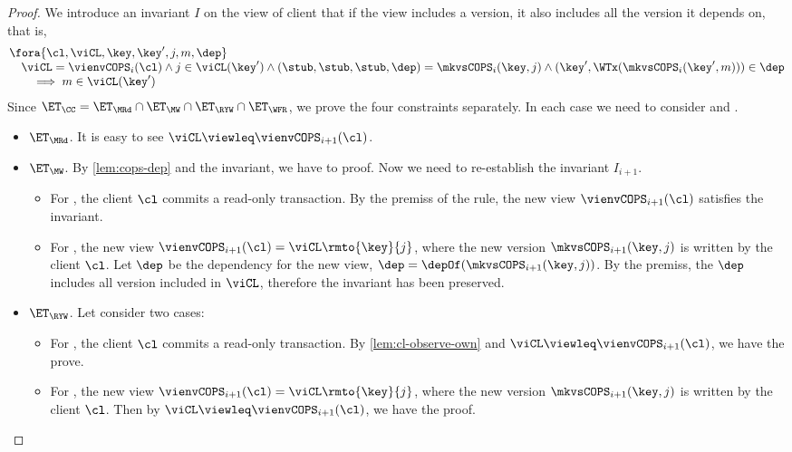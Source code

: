 \begin{proof}
    We introduce an invariant \( I \) on the view of client that if the view includes a version, 
    it also includes all the version it depends on, that is,
    \[
        \begin{array}{@{}l@{}}
        \fora{\cl, \viCL,\key,\key',j,m,\dep} \\
        \quad \viCL = \vienvCOPS_i(\cl) \land j \in \viCL(\key') 
        \land (\stub,\stub,\stub,\dep) = \mkvsCOPS_i(\key,j)
        \land (\key',\WTx(\mkvsCOPS_i(\key',m))) \in \dep \\
        \qquad \implies m \in \viCL(\key')
        \end{array}
    \]
    Since \( \ET_\CC = \ET_\MRd \cap \ET_\MW \cap \ET_\RYW \cap \ET_\WFR \), we prove the four constraints separately.
    In each case we need to consider  and .
    \begin{itemize}
        \item \( \ET_\MRd \). 
            It is easy to see \( \viCL \viewleq \vienvCOPS_{i+1}(\cl) \).

        \item \( \ET_\MW \).
            By \cref{lem:cops-dep} and the invariant, we have to proof.
            Now we need to re-establish the invariant \( I_{i+1} \).
            \begin{itemize}
                \item 
                For , the client \( \cl \) commits a read-only transaction.
                By the premiss of the rule, the new view \( \vienvCOPS_{i+1}(\cl) \) satisfies the invariant.
                \item For , the new view \( \vienvCOPS_{i+1}(\cl) = \viCL\rmto{\key}{j} \),
                where the new version \( \mkvsCOPS_{i+1}(\key,j)\) is written by the client \( \cl \).
                Let \( \dep \) be the dependency for the new view, \ie \( \dep = \depOf(\mkvsCOPS_{i+1}(\key,j)) \).
                By the premiss, the \( \dep \) includes all version included in \( \viCL \), 
                therefore the invariant has been preserved.
            \end{itemize}

        \item \( \ET_\RYW \). Let consider two cases:
            \begin{itemize}
                \item 
                For , the client \( \cl \) commits a read-only transaction.
                By \cref{lem:cl-observe-own} and  \( \viCL \viewleq \vienvCOPS_{i+1}(\cl) \),
                we have the prove.
            \item For , the new view \( \vienvCOPS_{i+1}(\cl) = \viCL\rmto{\key}{j} \),
                where the new version \( \mkvsCOPS_{i+1}(\key,j)\) is written by the client \( \cl \).
                Then by \( \viCL \viewleq \vienvCOPS_{i+1}(\cl) \), we have the proof.
            \end{itemize}


\end{itemize}
\end{proof}
